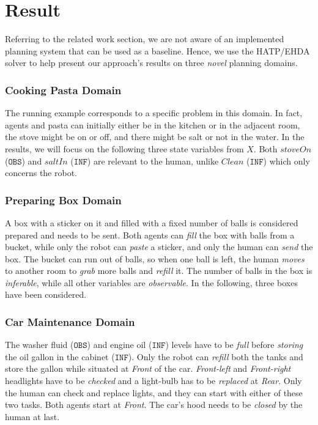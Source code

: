 {%
\section{Result}

Referring to the related work section, we are not aware of an implemented planning system that can be used as a baseline. Hence, we use the HATP/EHDA solver to help present our approach's results on three \textit{novel} planning domains.

\subsubsection{Cooking Pasta Domain}
The running example corresponds to a specific problem in this domain. In fact, agents and pasta can initially either be in the kitchen or in the adjacent room, the stove might be on or off, and there might be salt or not in the water.  
In the results, we will focus on the following three state variables from $X$. Both $stoveOn$ ($\texttt{OBS}$) and $saltIn$ ($\texttt{INF}$) are relevant to the human, unlike $Clean$ ($\texttt{INF}$) which only concerns the robot. 

\subsubsection{Preparing Box Domain}
A box with a sticker on it and filled with a fixed number of balls is considered prepared and needs to be sent. Both agents can \textit{fill} the box with balls from a bucket, while only the robot can \textit{paste} a sticker, and only the human can \textit{send} the box. The bucket can run out of balls, so when one ball is left, the human \textit{moves} to another room to \textit{grab} more balls and \textit{refill} it. 
The number of balls in the box is \textit{inferable}, while all other variables are {\em observable}. 
In the following, three boxes have been considered.

\subsubsection{Car Maintenance Domain}
The washer fluid ($\texttt{OBS}$) and engine oil ($\texttt{INF}$) levels have to be \textit{full} before \textit{storing} the oil gallon in the cabinet ($\texttt{INF}$). 
Only the robot can \textit{refill} both the tanks and store the gallon while situated at \textit{Front} of the car. 
\textit{Front-left} and \textit{Front-right} headlights have to be \textit{checked} and a light-bulb has to be \textit{replaced} at \textit{Rear}. 
Only the human can check and replace lights, and they can start with either of these two tasks.
Both agents start at \textit{Front}.
The car's hood needs to be \textit{closed} by the human at last.

}
